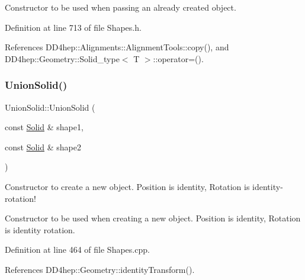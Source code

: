 Constructor to be used when passing an already created object. 



Definition at line 713 of file Shapes.\+h.



References D\+D4hep\+::\+Alignments\+::\+Alignment\+Tools\+::copy(), and D\+D4hep\+::\+Geometry\+::\+Solid\+\_\+type$<$ T $>$\+::operator=().

\hypertarget{class_d_d4hep_1_1_geometry_1_1_union_solid_ac7992ce96fd9cb28f65d7c85ee114be7}{}\label{class_d_d4hep_1_1_geometry_1_1_union_solid_ac7992ce96fd9cb28f65d7c85ee114be7} 
\subsubsection{\texorpdfstring{Union\+Solid()}{UnionSolid()}\hspace{0.1cm}{\footnotesize\ttfamily [4/8]}}
{\footnotesize\ttfamily Union\+Solid\+::\+Union\+Solid (\begin{DoxyParamCaption}\item[{const \hyperlink{namespace_d_d4hep_1_1_geometry_a83de90a8dcc7378ba47d54ef9a6a687b}{Solid} \&}]{shape1,  }\item[{const \hyperlink{namespace_d_d4hep_1_1_geometry_a83de90a8dcc7378ba47d54ef9a6a687b}{Solid} \&}]{shape2 }\end{DoxyParamCaption})}



Constructor to create a new object. Position is identity, Rotation is identity-\/rotation! 

Constructor to be used when creating a new object. Position is identity, Rotation is identity rotation. 

Definition at line 464 of file Shapes.\+cpp.



References D\+D4hep\+::\+Geometry\+::identity\+Transform().

\hypertarget{class_d_d4hep_1_1_geometry_1_1_union_solid_a0decd4e3d915dc725a2e85163fc0b604}{}\label{class_d_d4hep_1_1_geometry_1_1_union_solid_a0decd4e3d915dc725a2e85163fc0b604} 
